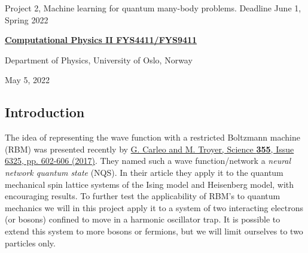 \documentclass[%
oneside,                 %
final,                   %
10pt]{article}
\begin{document}

\newcommand{\exercisesection}[1]{\subsection*{#1}}






\thispagestyle{empty}

\begin{center}
{\LARGE\bf
\begin{spacing}{1.25}
Project 2, Machine learning for  quantum many-body problems. Deadline June 1, Spring 2022
\end{spacing}
}
\end{center}


\begin{center}
{\bf \href{{http://www.uio.no/studier/emner/matnat/fys/FYS4411/index-eng.html}}{Computational Physics II FYS4411/FYS9411}}
\end{center}

    \begin{center}
\centerline{{\small Department of Physics, University of Oslo, Norway}}
\end{center}
    

\begin{center}
May 5, 2022
\end{center}

\vspace{1cm}


\subsection*{Introduction}

The idea of representing the wave function with
a restricted Boltzmann machine (RBM) was presented recently by \href{{http://science.sciencemag.org/content/355/6325/602}}{G. Carleo and M. Troyer, Science \textbf{355}, Issue 6325, pp. 602-606 (2017)}. They
named such a wave function/network a \textit{neural network quantum
state} (NQS). In their article they apply it to the quantum mechanical
spin lattice systems of the Ising model and Heisenberg model, with
encouraging results. To further test the applicability of RBM's to
quantum mechanics we will in this project apply it to a system of
two interacting electrons (or bosons)  confined to move in a harmonic oscillator trap.
It is possible to extend this system to more bosons or fermions, but we will limit ourselves to two particles only.
\end{document}
